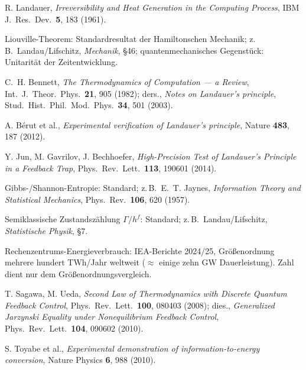 \documentclass[11pt,a4paper]{article}
\begin{document}
\begingroup
\small
\begin{description}[leftmargin=3.2em,style=sameline,itemsep=0.3em]

\item[{[B1]}] R. Landauer, \emph{Irreversibility and Heat Generation in the
Computing Process}, IBM J.\ Res.\ Dev.\ \textbf{5}, 183 (1961).

\item[{[B2]}] Liouville-Theorem: Standardresultat der Hamiltonschen Mechanik;
z.\,B.\ Landau/Lifschitz, \emph{Mechanik}, §46; quantenmechanisches Gegenstück:
Unitarität der Zeitentwicklung.

\item[{[B3]}] C.~H. Bennett, \emph{The Thermodynamics of Computation --- a
Review}, Int.\ J.\ Theor.\ Phys.\ \textbf{21}, 905 (1982); ders., \emph{Notes on
Landauer's principle}, Stud.\ Hist.\ Phil.\ Mod.\ Phys.\ \textbf{34}, 501 (2003).

\item[{[B4]}] A. Bérut et al., \emph{Experimental verification of Landauer's
principle}, Nature \textbf{483}, 187 (2012).

\item[{[B5]}] Y. Jun, M. Gavrilov, J. Bechhoefer, \emph{High-Precision Test of
Landauer's Principle in a Feedback Trap}, Phys.\ Rev.\ Lett.\ \textbf{113},
190601 (2014).

\item[{[B6]}] Gibbs-/Shannon-Entropie: Standard; z.\,B.\ E.~T. Jaynes,
\emph{Information Theory and Statistical Mechanics}, Phys.\ Rev.\ \textbf{106},
620 (1957).

\item[{[B7]}] Semiklassische Zustandszählung $\Gamma/h^f$: Standard; z.\,B.\
Landau/Lifschitz, \emph{Statistische Physik}, §7.

\item[{[B8]}] Rechenzentrums-Energieverbrauch: IEA-Berichte 2024/25,
Größenordnung mehrere hundert TWh/Jahr weltweit ($\approx$ einige zehn GW
Dauerleistung). Zahl dient nur dem Größenordnungsvergleich.

\item[{[B9]}] T. Sagawa, M. Ueda, \emph{Second Law of Thermodynamics with
Discrete Quantum Feedback Control}, Phys.\ Rev.\ Lett.\ \textbf{100}, 080403
(2008); dies., \emph{Generalized Jarzynski Equality under Nonequilibrium Feedback
Control}, Phys.\ Rev.\ Lett.\ \textbf{104}, 090602 (2010).

\item[{[B10]}] S. Toyabe et al., \emph{Experimental demonstration of
information-to-energy conversion}, Nature Physics \textbf{6}, 988 (2010).


\end{description}
\end{document}
